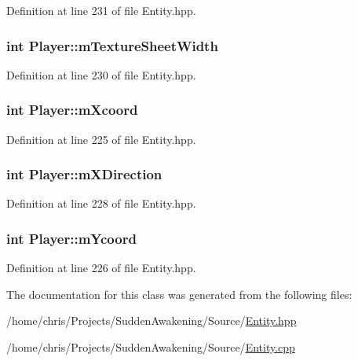 Definition at line 231 of file Entity.\-hpp.

\hypertarget{class_player_abdccfacdffb3a21371af39dbe0255453}{
\subsubsection[{m\-Texture\-Sheet\-Width}]{\setlength{\rightskip}{0pt plus 5cm}int Player\-::m\-Texture\-Sheet\-Width\hspace{0.3cm}{\ttfamily [protected]}}}\label{class_player_abdccfacdffb3a21371af39dbe0255453}


Definition at line 230 of file Entity.\-hpp.

\hypertarget{class_player_ab5f657ba805e70319fc312533d715d96}{
\subsubsection[{m\-Xcoord}]{\setlength{\rightskip}{0pt plus 5cm}int Player\-::m\-Xcoord\hspace{0.3cm}{\ttfamily [protected]}}}\label{class_player_ab5f657ba805e70319fc312533d715d96}


Definition at line 225 of file Entity.\-hpp.

\hypertarget{class_player_a141ca66b2ec828bb84617b21dc7e9db0}{
\subsubsection[{m\-X\-Direction}]{\setlength{\rightskip}{0pt plus 5cm}int Player\-::m\-X\-Direction\hspace{0.3cm}{\ttfamily [protected]}}}\label{class_player_a141ca66b2ec828bb84617b21dc7e9db0}


Definition at line 228 of file Entity.\-hpp.

\hypertarget{class_player_ab3a89b65abf92da672ebc3c55b22dc80}{
\subsubsection[{m\-Ycoord}]{\setlength{\rightskip}{0pt plus 5cm}int Player\-::m\-Ycoord\hspace{0.3cm}{\ttfamily [protected]}}}\label{class_player_ab3a89b65abf92da672ebc3c55b22dc80}


Definition at line 226 of file Entity.\-hpp.



The documentation for this class was generated from the following files\-:\begin{DoxyCompactItemize}
\item 
/home/chris/\-Projects/\-Sudden\-Awakening/\-Source/\hyperlink{_entity_8hpp}{Entity.\-hpp}\item 
/home/chris/\-Projects/\-Sudden\-Awakening/\-Source/\hyperlink{_entity_8cpp}{Entity.\-cpp}\end{DoxyCompactItemize}

